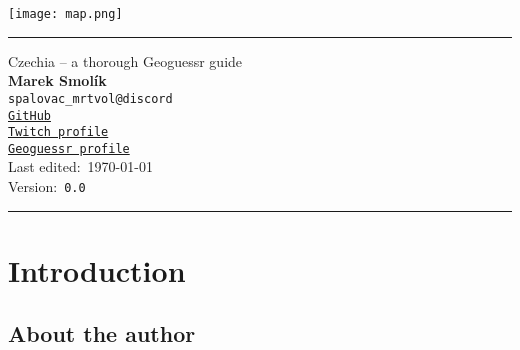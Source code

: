 \documentclass[12pt, oneside]{article}
\begin{document}
\thispagestyle{empty}
\begin{center}
	\texttt{[image: map.png]}
	
  \vspace*{4em}

  \rule{\linewidth}{0.5mm}
  \vspace*{1em}
  
  {\LARGE Czechia – a thorough Geoguessr guide} \\ [1cm]
	\textbf{\Large Marek Smolík}
  \\ \texttt{spalovac\_mrtvol@discord}
  \\ \texttt{\href{https://github.com/dynamo58}{GitHub}}
  \\ \texttt{\href{https://www.twitch.tv/bigladmush22}{Twitch profile}}
  \\ \texttt{\href{https://www.geoguessr.com/user/5ee78ead03f80c500c7cba22}{Geoguessr profile}}
  \vspace*{1em}
  \\ Last edited:\ \today
  \\ Version:\ \texttt{0.0}


  \vspace*{1em}
  \rule{\linewidth}{0.5mm}
\end{center}

\newpage

\tableofcontents

\newpage

\begin{abstract}
Czechia or the Czech republic is a country notoriously difficult. For one thing it is very difficult to region-guess and at times also to distinguish from some of the surrounding countries. This document tries to outline all of the possible metas and actual geography knowledge there is to be obtain in order to guess this country accuretly and be able to make informed region-guesses within the country itself.
\end{abstract}

\clearpage

\setcounter{page}{1}

\section{Introduction}

\subsection{About the author}
\end{document}
